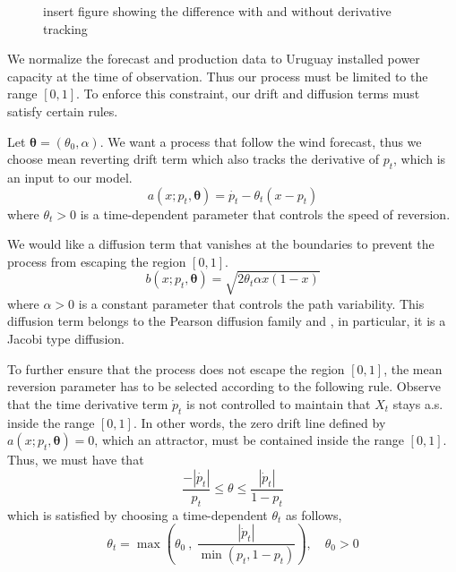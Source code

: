 \documentclass[11pt,english]{article}
\begin{document}
\begin{figure}
  \caption{insert figure showing the difference with and without derivative tracking}
  \label{fig:derivative_tracking}
\end{figure}


We normalize the forecast and production data to Uruguay  installed power capacity at the time of observation. Thus our process must be limited to the range $[0,1]$. To enforce this constraint, our  drift and diffusion terms  must satisfy certain rules.
 

Let $\bm{\theta} = (\theta_0,\alpha)$. We want a process that follow the wind forecast, thus we choose mean reverting drift term which also tracks the derivative of $p_t$, which is an input to our model.
  \begin{equation}
    a(x; p_t,\bm{\theta})=  \dot{p_t} - \theta_t(x - p_t)
  \end{equation}
where $\theta_t>0$ is a time-dependent parameter that controls the speed of reversion.


We would like  a diffusion term that vanishes at the boundaries to prevent the process from escaping the region $[0,1]$.
  \begin{equation}
    b (x; p_t,\bm{\theta} )= \sqrt{2 \theta_t \alpha x (1-x)}
  \end{equation}
  where $\alpha >0$ is a constant parameter that controls the path variability. This diffusion term belongs to the Pearson diffusion family and , in particular, it is a Jacobi type diffusion.

To further ensure that the process does not escape the region $[0,1]$, the mean reversion parameter has to be selected according to the following rule. Observe that the time derivative term $\dot{p}_t $ is not controlled to maintain that $X_t$ stays a.s.  inside the range $[0,1]$. In other words, the zero drift line defined by $a(x; p_t,\bm{\theta}) =0$, which an attractor, must be contained inside the range $[0,1]$. Thus, we must have that
\begin{equation}
\frac{- |\dot{p_t}|}{p_t} \leq \theta \leq \frac{|\dot{p}_t|}{1- p_t}
\end{equation}
which is satisfied  by choosing a time-dependent  $\theta_t$ as follows,
\begin{equation}
\theta_t = \max \left( \theta_0 \ , \ \frac{|\dot{p}_t|}{\min (p_t, 1-p_t)}  \right ),  \quad \theta_0 >0 \label{theta_t}
\end{equation}
\end{document}
